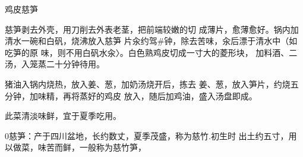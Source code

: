 \begin{recipe}{鸡皮慈笋}

\ingredients



\cooking

慈笋剥去外壳，用刀削去外表老茎，把前端较嫩的切 成薄片，愈薄愈好。锅内加清水一碗和白矾，烧沸放入慈笋 片汆约驾#钟，除去苦味，汆后漂于清水中（如吃笋的原 味，则不用白矾水汆〉。白色熟鸡皮切成一寸大的菱形块， 加料酒、二汤，入笼蒸二十分钟待用。

\step 猪油入锅内烧热，放入姜、葱，加奶汤烧开后，拣去 姜、葱，放入笋片，约烧五分钟，加味精，再将蒸好的鸡皮 放入，随后加鸡油，盛入汤盘即成。

\notes

此菜清淡味鲜，宜于夏季吃用。

0慈笋：产于四川盆地，长约数丈，夏季茂盛，称为慈竹.初生时 出土约五寸，用以做菜，味苦而鲜，一般称为慈竹笋，

\end{recipe}

